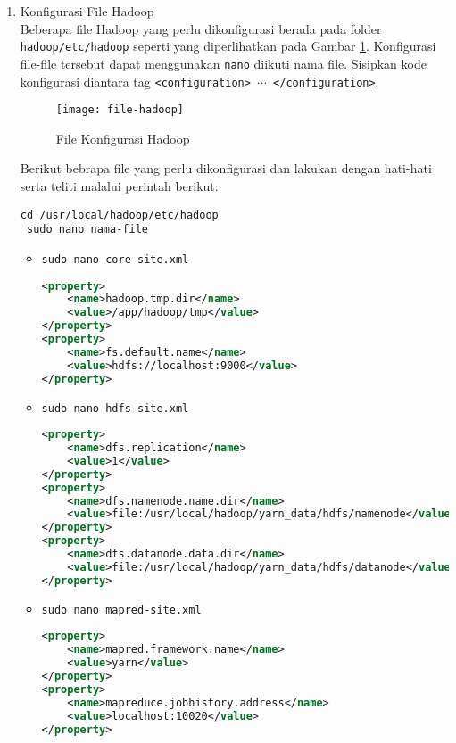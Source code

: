\documentclass[a4paper]{tufte-handout}
\begin{document}
\begin{enumerate}
\item Konfigurasi File Hadoop \\
Beberapa file Hadoop yang perlu dikonfigurasi berada pada folder {\tt hadoop/etc/hadoop} seperti yang diperlihatkan pada Gambar \ref{gam:file-hadoop}. Konfigurasi file-file tersebut dapat menggunakan {\tt nano} diikuti nama file. Sisipkan kode konfigurasi diantara tag {\tt <configuration> $\cdots$ </configuration>}.

\begin{figure}[!ht]
\texttt{[image: file-hadoop]}
\caption{File Konfigurasi Hadoop}
\label{gam:file-hadoop}
\end{figure}

Berikut bebrapa file yang perlu dikonfigurasi dan lakukan dengan hati-hati serta teliti malalui perintah berikut:
\begin{lstlisting}[language=Terminal]
 cd /usr/local/hadoop/etc/hadoop
 sudo nano nama-file
\end{lstlisting}

\begin{itemize}

\item {\tt sudo nano core-site.xml}
\begin{lstlisting}[language=XML]
<property>
	<name>hadoop.tmp.dir</name>
	<value>/app/hadoop/tmp</value>
</property>
<property>
	<name>fs.default.name</name>
	<value>hdfs://localhost:9000</value>
</property>
\end{lstlisting}

\item {\tt sudo nano hdfs-site.xml}
\begin{lstlisting}[language=XML]
<property>
	<name>dfs.replication</name>
	<value>1</value>
</property>
<property>
	<name>dfs.namenode.name.dir</name>
	<value>file:/usr/local/hadoop/yarn_data/hdfs/namenode</value>
</property>
<property>
	<name>dfs.datanode.data.dir</name>
	<value>file:/usr/local/hadoop/yarn_data/hdfs/datanode</value>
</property>
\end{lstlisting}

\item {\tt sudo nano mapred-site.xml}
\begin{lstlisting}[language=XML]
<property>
	<name>mapred.framework.name</name>
	<value>yarn</value>
</property>
<property>
	<name>mapreduce.jobhistory.address</name>
	<value>localhost:10020</value>
</property>
\end{lstlisting}


\end{itemize}
\end{enumerate}
\end{document}
